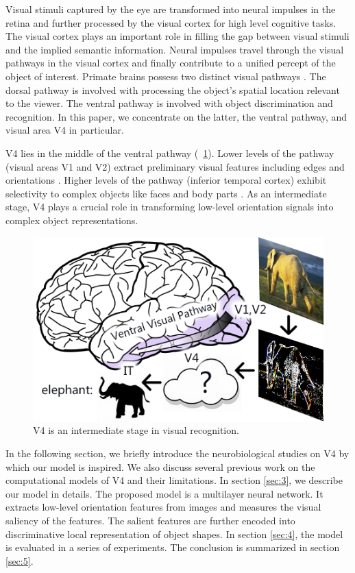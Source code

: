 \documentclass[conference]{IEEEtran}
\begin{document}
Visual stimuli captured by the eye are transformed into neural impulses in the retina 
and further processed by the visual cortex for high level cognitive tasks. 
The visual cortex plays an important role in filling the gap 
between visual stimuli and the implied semantic information.
Neural impulses travel through the visual pathways in the visual cortex 
and finally contribute to a unified percept of the object of interest.
Primate brains possess two distinct visual pathways \cite{ettlinger1990,lehky2007}.
The dorsal pathway is involved with processing the object's spatial location relevant to the viewer. 
The ventral pathway is involved with object discrimination and recognition.
In this paper, we concentrate on the latter, the ventral pathway, and visual area V4 in particular.

V4 lies in the middle of the ventral pathway (\figurename~\ref{fig:1}).
Lower levels of the pathway (visual areas V1 and V2) extract preliminary visual features 
including edges and orientations \cite{hubel1962,hubel1965}.
Higher levels of the pathway (inferior temporal cortex) exhibit selectivity to complex objects
like faces and body parts \cite{bruce1981,bell2009}.
As an intermediate stage, V4 plays a crucial role in transforming low-level orientation signals 
into complex object representations.

\begin{figure}[htp]
\centerline{\includegraphics[width=0.7\linewidth]{images/fig1.png}} 
\caption{V4 is an intermediate stage in visual recognition.}
\label{fig:1}
\end{figure}

In the following section, we briefly introduce the neurobiological studies on V4 by which our model is inspired.
We also discuss several previous work on the computational models of V4 and their limitations.
In section \ref{sec:3}, we describe our model in details.
The proposed model is a multilayer neural network.
It extracts low-level orientation features from images and measures the visual saliency of the features.
The salient features are further encoded into discriminative local representation of object shapes.
In section \ref{sec:4}, the model is evaluated in a series of experiments.
The conclusion is summarized in section \ref{sec:5}.
\end{document}
